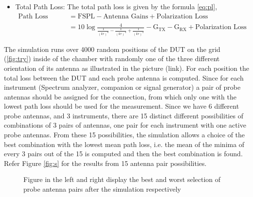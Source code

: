 \begin{itemize}
  \item Total Path Loss:
  The total path loss is given by the formula \ref{eq:pl},
  \begin{equation}  \label{eq:pl}
  \begin{split}
  \mbox{Path Loss (k,r)}  & = \mbox{FSPL} - \mbox{Antenna Gains} + \mbox{Polarization Loss} \\
  &= 10 \log\frac{4}{\frac{1}{(kr)^6}-\frac{1}{(kr)^4}+\frac{1}{(kr)^2}} - \mbox{G}_{\mbox{TX}} - \mbox{G}_{\mbox{RX}} + \mbox{Polarization Loss}
 \end{split}
 \end{equation}
   
   \end{itemize}
   
   
The simulation runs over 4000 random positions of the \acs{DUT} on the grid (\ref{fig:try}) inside of the chamber with randomly one of the three different orientation of its antenna as illustrated in the picture (link). For each position the total loss between the \acs{DUT} and each probe antenna is computed. Since for each instrument (Spectrum analyzer, companion or signal generator) a pair of probe antennas should be assigned for the connection, from which only one with the lowest path loss should be used for the measurement. Since we have 6 different probe antennas, and 3 instruments, there are 15 distinct different possibilities of combinations of 3 pairs of antennas, one pair for each instrument with one active probe antennas. From these 15 possibilities, the simulation allows a choice of the best combination with the lowest mean path loss, i.e. the mean of the minima of every 3 pairs out of the 15 is computed and then the best combination is found. Refer Figure \ref{fig:s} for the results from  15 antenna pair possibilities.

\begin{figure}[H]
\vspace{-3cm}
  \hspace{-1.7cm}
  \hspace{-3cm}
   \vspace{-4.8cm}
\caption{Figure in the left and right display the best and worst selection of probe antenna pairs after the simulation respectively}
\label{fig:simu}
\end{figure}



